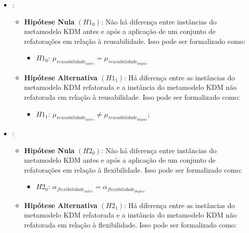 
\begin{itemize}

\item {}:

\begin{itemize}
\item \textbf{Hipótese Nula} \textbf{$(H1_{0})$}: Não há diferença entre instâncias do metamodelo KDM antes e após a aplicação de um conjunto de refatorações em relação à reusabilidade. Isso pode ser formalizado como: 

\begin{itemize}
\item $H1_{0}$: $\mu_{reusabilidade_{antes}} = \mu_{reusabilidade_{depois}}$
\end{itemize}

\item \textbf{Hipótese Alternativa} \textbf{$(H1_{1})$}: Há diferença entre as instâncias do metamodelo KDM refatorada e a instância do metamodelo KDM não refatorada em relação à reusabilidade. Isso pode ser formalizado como: 

\begin{itemize}
\item $H1_{1}$: $\mu_{reusabilidade_{antes}} \neq \mu_{reusabilidade_{depois}}$;
\end{itemize}
\end{itemize}

\item {}:

\begin{itemize}
\item \textbf{Hipótese Nula} \textbf{$(H2_{0})$}: Não há diferença entre instâncias do metamodelo KDM antes e após a aplicação de um conjunto de refatorações em relação à flexibilidade. Isso pode ser formalizado como: 

\begin{itemize}
\item $H2_{0}$: $\alpha_{flexibilidade_{antes}} = \alpha_{flexibilidade_{depois}}$
\end{itemize}

\item \textbf{Hipótese Alternativa} \textbf{$(H2_{1})$}: Há diferença entre as instâncias do metamodelo KDM refatorada e a instância do metamodelo KDM não refatorada em relação à flexibilidade. Isso pode ser formalizado como: 


\end{itemize}
\end{itemize}
